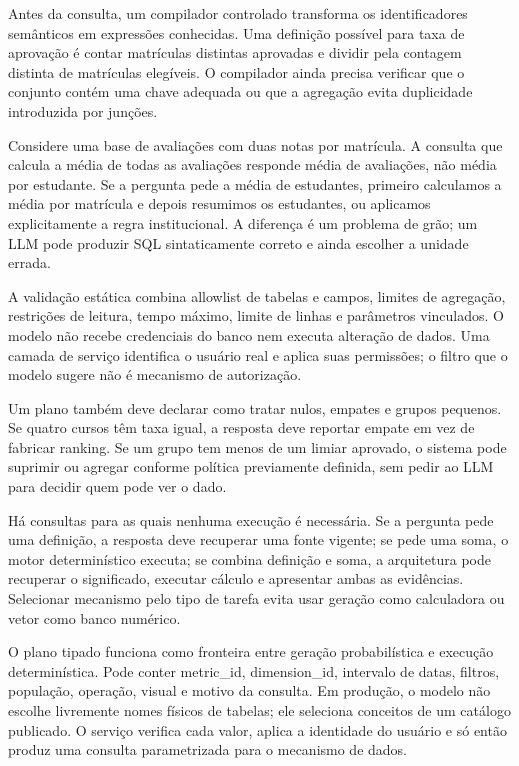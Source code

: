 Antes da consulta, um compilador controlado transforma os identificadores semânticos em expressões conhecidas. Uma definição possível para taxa de aprovação é contar matrículas distintas aprovadas e dividir pela contagem distinta de matrículas elegíveis. O compilador ainda precisa verificar que o conjunto contém uma chave adequada ou que a agregação evita duplicidade introduzida por junções.

Considere uma base de avaliações com duas notas por matrícula. A consulta que calcula a média de todas as avaliações responde média de avaliações, não média por estudante. Se a pergunta pede a média de estudantes, primeiro calculamos a média por matrícula e depois resumimos os estudantes, ou aplicamos explicitamente a regra institucional. A diferença é um problema de grão; um LLM pode produzir SQL sintaticamente correto e ainda escolher a unidade errada.

A validação estática combina allowlist de tabelas e campos, limites de agregação, restrições de leitura, tempo máximo, limite de linhas e parâmetros vinculados. O modelo não recebe credenciais do banco nem executa alteração de dados. Uma camada de serviço identifica o usuário real e aplica suas permissões; o filtro que o modelo sugere não é mecanismo de autorização.

Um plano também deve declarar como tratar nulos, empates e grupos pequenos. Se quatro cursos têm taxa igual, a resposta deve reportar empate em vez de fabricar ranking. Se um grupo tem menos de um limiar aprovado, o sistema pode suprimir ou agregar conforme política previamente definida, sem pedir ao LLM para decidir quem pode ver o dado.

Há consultas para as quais nenhuma execução é necessária. Se a pergunta pede uma definição, a resposta deve recuperar uma fonte vigente; se pede uma soma, o motor determinístico executa; se combina definição e soma, a arquitetura pode recuperar o significado, executar cálculo e apresentar ambas as evidências. Selecionar mecanismo pelo tipo de tarefa evita usar geração como calculadora ou vetor como banco numérico.

O plano tipado funciona como fronteira entre geração probabilística e execução determinística. Pode conter metric\_id, dimension\_id, intervalo de datas, filtros, população, operação, visual e motivo da consulta. Em produção, o modelo não escolhe livremente nomes físicos de tabelas; ele seleciona conceitos de um catálogo publicado. O serviço verifica cada valor, aplica a identidade do usuário e só então produz uma consulta parametrizada para o mecanismo de dados.


